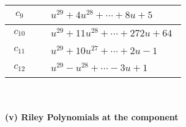 \documentclass[1p]{elsarticle_modified}
\theoremstyle{definition}
\begin{document}
\begin{tabular}{m{50pt}|m{274pt}}
\hline $$\begin{aligned}c_{9}\end{aligned}$$&$\begin{aligned}
&u^{29}+4 u^{28}+\cdots+8 u+5
\end{aligned}$\\
\hline $$\begin{aligned}c_{10}\end{aligned}$$&$\begin{aligned}
&u^{29}+11 u^{28}+\cdots+272 u+64
\end{aligned}$\\
\hline $$\begin{aligned}c_{11}\end{aligned}$$&$\begin{aligned}
&u^{29}+10 u^{27}+\cdots+2 u-1
\end{aligned}$\\
\hline $$\begin{aligned}c_{12}\end{aligned}$$&$\begin{aligned}
&u^{29}- u^{28}+\cdots-3 u+1
\end{aligned}$\\
\hline
\end{tabular}\\~\\
\newpage\renewcommand{\arraystretch}{1}
\flushleft \textbf{(v) Riley Polynomials at the component}\newline \\
\end{document}
